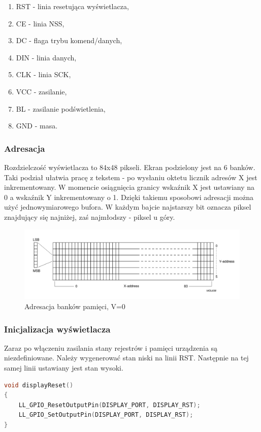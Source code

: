 \documentclass{article}
\begin{document}
\begin{enumerate}
    \item RST - linia resetująca wyświetlacza,
    \item CE - linia NSS,
    \item DC - flaga trybu komend/danych,
    \item DIN - linia danych,
    \item CLK - linia SCK,
    \item VCC - zasilanie,
    \item BL - zasilanie podświetlenia,
    \item GND - masa.
\end{enumerate}

\subsubsection{Adresacja}
Rozdzielczość wyświetlacza to 84x48 pikseli. Ekran podzielony jest na 6 banków.
Taki podział ułatwia pracę z tekstem - po wysłaniu oktetu licznik adresów
X jest inkrementowany. W momencie osiągnięcia granicy wskaźnik X jest ustawiany na
0 a wskaźnik Y inkrementowany o 1. Dzięki takiemu sposobowi adresacji można użyć
jednowymiarowego bufora. W każdym bajcie najstarszy bit oznacza piksel znajdujący się najniżej,
zaś najmłodszy - piksel u góry.


\begin{figure}[ht]
    \includegraphics[scale=0.50]{address_display}
    \caption{Adresacja banków pamięci, V=0}
\end{figure}

\subsubsection{Inicjalizacja wyświetlacza}
Zaraz po włączeniu zasilania stany rejestrów i pamięci urządzenia są niezdefiniowane.
Należy wygenerować stan niski na linii RST. Następnie na tej samej linii ustawiany
jest stan wysoki.

\begin{center}
\begin{lstlisting}[language=C, basicstyle=\footnotesize]
void displayReset()
{
    LL_GPIO_ResetOutputPin(DISPLAY_PORT, DISPLAY_RST);
    LL_GPIO_SetOutputPin(DISPLAY_PORT, DISPLAY_RST);
} 
\end{lstlisting}
\end{center}
\end{document}
